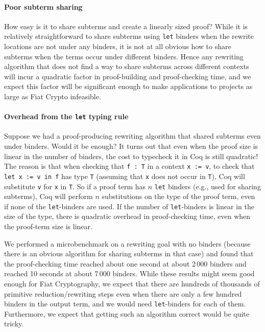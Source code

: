 \paragraph{Poor subterm sharing}

How easy is it to share subterms and create a linearly sized proof?
While it is relatively straightforward to share subterms using \texttt{let} binders when the rewrite locations are not under any binders, it is not at all obvious how to share subterms when the terms occur under different binders.
Hence any rewriting algorithm that does not find a way to share subterms across different contexts will incur a quadratic factor in proof-building and proof-checking time, and we expect this factor will be significant enough to make applications to projects as large as Fiat Crypto infeasible.

\paragraph{Overhead from the \texttt{let} typing rule}

Suppose we had a proof-producing rewriting algorithm that shared subterms even under binders.
Would it be enough?
It turns out that even when the proof size is linear in the number of binders, the cost to typecheck it in Coq is still quadratic!
The reason is that when checking that \texttt{f : T} in a context \texttt{x := v}, to check that \texttt{let x := v in f} has type \texttt{T} (assuming that \texttt{x} does not occur in \texttt{T}), Coq will substitute \texttt{v} for \texttt{x} in \texttt{T}.
So if a proof term has $n$ \texttt{let} binders (e.g., used for sharing subterms), Coq will perform $n$ substitutions on the type of the proof term, even if none of the \texttt{let}-binders are used.
If the number of \texttt{let}-binders is linear in the size of the type, there is quadratic overhead in proof-checking time, even when the proof-term size is linear.

We performed a microbenchmark on a rewriting goal with no binders (because there is an obvious algorithm for sharing subterms in that case) and found that the proof-checking time reached about one second at about 2\,000 binders and reached 10 seconds at about 7\,000 binders.
While these results might seem good enough for Fiat Cryptography, we expect that there are hundreds of thousands of primitive reduction/rewriting steps even when there are only a few hundred binders in the output term, and we would need \texttt{let}-binders for each of them.
Furthermore, we expect that getting such an algorithm correct would be quite tricky.


